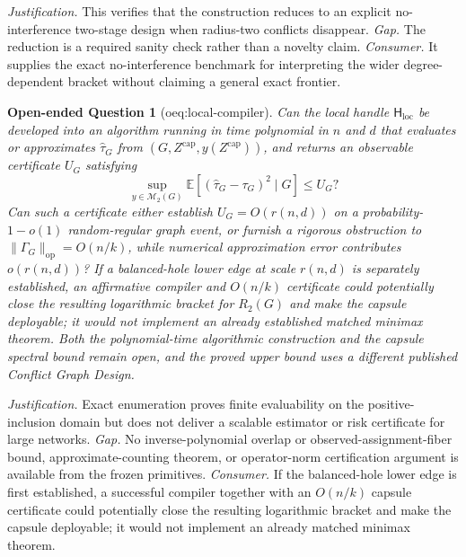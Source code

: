 \documentclass{article}
\newtheorem{openendedquestion}{Open-ended Question}
\begin{document}
\par\smallskip\noindent \textit{Justification.} This verifies that the construction reduces to an explicit no-interference two-stage design when radius-two conflicts disappear. \textit{Gap.} The reduction is a required sanity check rather than a novelty claim. \textit{Consumer.} It supplies the exact no-interference benchmark for interpreting the wider degree-dependent bracket without claiming a general exact frontier.

\begin{openendedquestion}[oeq:local-compiler]\label{oeq:local-compiler}
Can the local handle \(\mathsf H_{\mathrm{loc}}\) be developed into an algorithm running in time polynomial in \(n\) and \(d\) that evaluates or approximates \(\widehat\tau_G\) from \((G,Z^{\mathrm{cap}},y(Z^{\mathrm{cap}}))\), and returns an observable certificate \(U_G\) satisfying \[\sup_{y\in\mathcal M_2(G)}\mathbb E[(\widehat\tau_G-\tau_G)^2\mid G]\le U_G?\] Can such a certificate either establish \(U_G=O(r(n,d))\) on a probability-\(1-o(1)\) random-regular graph event, or furnish a rigorous obstruction to \(\|\Gamma_G\|_{\mathrm{op}}=O(n/k)\), while numerical approximation error contributes \(o(r(n,d))\)? If a balanced-hole lower edge at scale \(r(n,d)\) is separately established, an affirmative compiler and \(O(n/k)\) certificate could potentially close the resulting logarithmic bracket for \(R_2(G)\) and make the capsule deployable; it would not implement an already established matched minimax theorem. Both the polynomial-time algorithmic construction and the capsule spectral bound remain open, and the proved upper bound uses a different published Conflict Graph Design.
\end{openendedquestion}
\par\smallskip\noindent \textit{Justification.} Exact enumeration proves finite evaluability on the positive-inclusion domain but does not deliver a scalable estimator or risk certificate for large networks. \textit{Gap.} No inverse-polynomial overlap or observed-assignment-fiber bound, approximate-counting theorem, or operator-norm certification argument is available from the frozen primitives. \textit{Consumer.} If the balanced-hole lower edge is first established, a successful compiler together with an \(O(n/k)\) capsule certificate could potentially close the resulting logarithmic bracket and make the capsule deployable; it would not implement an already matched minimax theorem.
\end{document}
